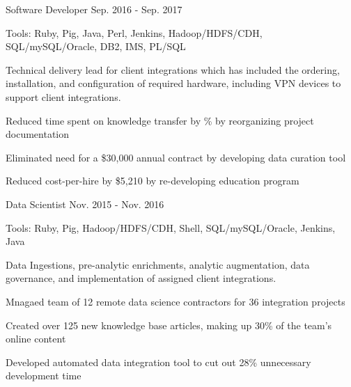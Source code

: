\begin{cventries}
  \cvexpsubposition
    {Software Developer} %
    {Sep. 2016 - Sep. 2017} %
    {}
    {
      \begin{cvheavyparagraph}
        Tools: Ruby, Pig, Java, Perl, Jenkins, Hadoop/HDFS/CDH, SQL/mySQL/Oracle, DB2, IMS, PL/SQL
      \end{cvheavyparagraph}
    }
    {
      \begin{cvparagraph}
        Technical delivery lead for client integrations which has included the ordering, installation, and configuration of required hardware, including VPN devices to support client integrations.
      \end{cvparagraph}
      \begin{cvitems} %
        \item {Reduced time spent on knowledge transfer by \% by reorganizing project documentation}
        \item {Eliminated need for a \$30,000 annual contract by developing data curation tool}
        \item {Reduced cost-per-hire by \$5,210 by re-developing education program}
      \end{cvitems}
    }

  \cvexpsubposition
    {Data Scientist} %
    {Nov. 2015 - Nov. 2016} %
    {}
    {
      \begin{cvheavyparagraph}
        Tools: Ruby, Pig, Hadoop/HDFS/CDH, Shell, SQL/mySQL/Oracle, Jenkins, Java
      \end{cvheavyparagraph}
    }
    {
      \begin{cvparagraph}
        Data Ingestions, pre-analytic enrichments, analytic augmentation, data governance, and implementation of assigned client integrations.
      \end{cvparagraph}
      \begin{cvitems} %
        \item {Mnagaed team of 12 remote data science contractors for 36 integration projects}
        \item {Created over 125 new knowledge base articles, making up 30\% of the team's online content}
        \item {Developed automated data integration tool to cut out 28\% unnecessary development time}
      \end{cvitems}
    }


\end{cventries}
